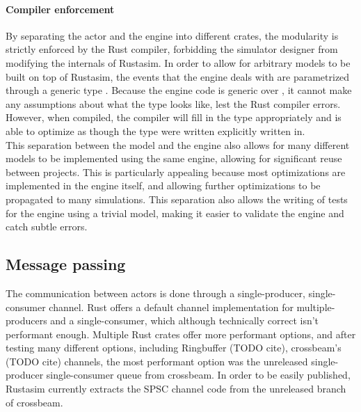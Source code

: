 \paragraph{Compiler enforcement}
By separating the actor and the engine into different crates, the modularity is strictly enforced by the Rust compiler, forbidding the simulator designer from modifying the internals of Rustasim.
In order to allow for arbitrary models to be built on top of Rustasim, the events that the engine deals with are parametrized through a generic type .
Because the engine code is generic over , it cannot make any assumptions about what the type looks like, lest the Rust compiler errors.
However, when compiled, the compiler will fill in the type appropriately and is able to optimize as though the type were written explicitly written in.\\
This separation between the model and the engine also allows for many different models to be implemented using the same engine, allowing for significant reuse between projects.
This is particularly appealing because most optimizations are implemented in the engine itself, and allowing further optimizations to be propagated to many simulations.
This separation also allows the writing of tests for the engine using a trivial model, making it easier to validate the engine and catch subtle errors.

\subsection{Message passing} \label{rustasim-message-passing}

The communication between actors is done through a single-producer, single-consumer channel.
Rust offers a default channel implementation for multiple-producers and a single-consumer, which although technically correct isn't performant enough.
Multiple Rust crates offer more performant options, and after testing many different options, including Ringbuffer (TODO cite), crossbeam's (TODO cite) channels, the most performant option was the unreleased single-producer single-consumer queue from crossbeam.
In order to be easily published, Rustasim currently extracts the SPSC channel code from the unreleased branch of crossbeam.

